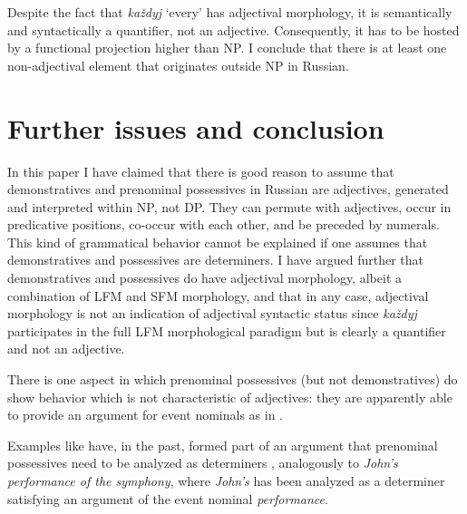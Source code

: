 \documentclass[output=paper,
colorlinks,
citecolor=brown,
newtxmath
]{langscibook}
\begin{document}
Despite the fact that \textit{každyj} `every' has adjectival morphology, it is semantically and syntactically a quantifier, not an adjective. Consequently, it has to be hosted by a functional projection higher than NP. I conclude that there is at least one non-adjectival element that originates outside NP in Russian. 
%
%
\section{Further issues and conclusion}\label{conclusion}

In this paper I have claimed that there is good reason to assume that demonstratives and prenominal possessives in Russian are adjectives, generated and interpreted within NP, not DP. They can permute with adjectives, occur in predicative positions, co-occur with each other, and be preceded by numerals. This kind of grammatical behavior cannot be explained if one assumes that demonstratives and possessives are determiners. I have argued further that demonstratives and possessives do have adjectival morphology, albeit a combination of LFM and SFM morphology, and that in any case, adjectival morphology is not an indication of adjectival syntactic status since \textit{každyj} participates in the full LFM morphological paradigm but is clearly a quantifier and not an adjective.  

There is one aspect in which prenominal possessives (but not demonstratives) do show behavior which is not characteristic of adjectives: they are apparently able to provide an argument for event nominals as in .


\ea\label{42_nedovoltstvo} 
\z\z

\noindent Examples like  have, in the past, formed part of an argument that prenominal possessives need to be analyzed as determiners  \citep[e.g.][]{Babyonyshev1997}, analogously to \textit{John’s performance of the symphony}, where \textit{John’s} has been analyzed as a determiner satisfying an argument of the event nominal \textit{performance}. 
\end{document}
